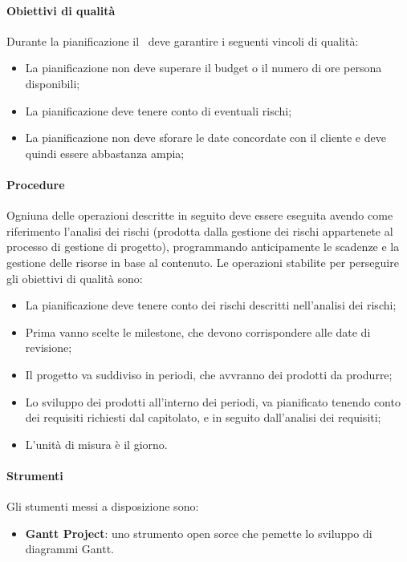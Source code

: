 \documentclass[../NormeDiProgetto_v4.0.0.tex]{subfiles}
\begin{document}
			\paragraph{Obiettivi di qualità}
				Durante la pianificazione il \responsabilediprogetto\ deve garantire i seguenti vincoli di qualità: 
				\begin{itemize}
					\item La pianificazione non deve superare il budget o il numero di ore persona disponibili;
					\item La pianificazione deve tenere conto di eventuali rischi;
					\item La pianificazione non deve sforare le date concordate con il cliente e deve quindi essere abbastanza ampia;
				\end{itemize}
	
			\paragraph{Procedure}
				Ogniuna delle operazioni descritte in seguito deve essere eseguita avendo come riferimento l'analisi dei rischi (prodotta dalla gestione dei rischi appartenete al processo di gestione di progetto), programmando anticipamente le scadenze e la gestione delle risorse in base al contenuto.
				Le operazioni stabilite per perseguire gli obiettivi di qualità sono:
				\begin{itemize}
					\item La pianificazione deve tenere conto dei rischi descritti nell'analisi dei rischi;
					\item Prima vanno scelte le milestone, che devono corrispondere alle date di revisione;
					\item Il progetto va suddiviso in periodi, che avvranno dei prodotti da produrre;
					\item Lo sviluppo dei prodotti all'interno dei periodi, va pianificato tenendo conto dei requisiti richiesti dal capitolato, e in seguito dall'analisi dei requisiti;
					\item L'unità di misura è il giorno.
				\end{itemize}

			\paragraph{Strumenti}
				Gli stumenti messi a disposizione sono:
				\begin{itemize}
					\item \textbf{Gantt Project}: uno strumento open sorce che pemette lo sviluppo di diagrammi Gantt.
				\end{itemize}
\end{document}
